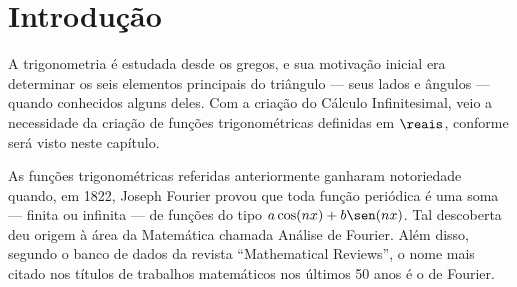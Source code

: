 \section{Introdução}

A trigonometria é estudada desde os gregos, e sua motivação inicial
era determinar os seis elementos principais do triângulo --- seus lados
e ângulos --- quando conhecidos alguns deles. Com a criação do Cálculo Infinitesimal, veio a necessidade da criação
de funções trigonométricas definidas em $\reais$, conforme será visto neste capítulo.

As funções trigonométricas referidas anteriormente ganharam notoriedade quando, em 1822, Joseph Fourier
provou que toda função periódica é uma soma --- finita ou infinita --- de
funções do tipo $a\cos (nx) +b \sen (nx)$. Tal descoberta deu origem
à área da Matemática chamada Análise de Fourier. Além disso,
segundo o banco de dados da revista ``Mathematical Reviews'', o nome
mais citado nos títulos de trabalhos matemáticos nos últimos 50 anos
é o de Fourier.
